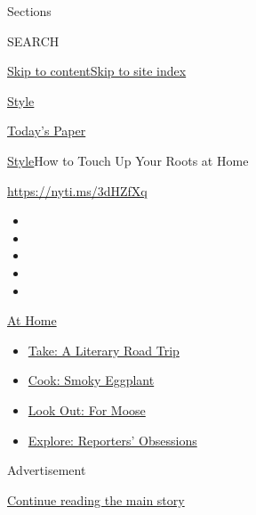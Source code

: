 Sections

SEARCH

\protect\hyperlink{site-content}{Skip to
content}\protect\hyperlink{site-index}{Skip to site index}

\href{https://www.nytimes.com/section/style}{Style}

\href{https://myaccount.nytimes.com/auth/login?response_type=cookie\&client_id=vi}{}

\href{https://www.nytimes.com/section/todayspaper}{Today's Paper}

\href{/section/style}{Style}\textbar{}How to Touch Up Your Roots at Home

\url{https://nyti.ms/3dHZfXq}

\begin{itemize}
\item
\item
\item
\item
\item
\end{itemize}

\href{https://www.nytimes.com/spotlight/at-home?action=click\&pgtype=Article\&state=default\&region=TOP_BANNER\&context=at_home_menu}{At
Home}

\begin{itemize}
\tightlist
\item
  \href{https://www.nytimes.com/2020/07/28/books/time-for-a-literary-road-trip.html?action=click\&pgtype=Article\&state=default\&region=TOP_BANNER\&context=at_home_menu}{Take:
  A Literary Road Trip}
\item
  \href{https://www.nytimes.com/2020/07/29/magazine/bored-with-your-home-cooking-some-smoky-eggplant-will-fix-that.html?action=click\&pgtype=Article\&state=default\&region=TOP_BANNER\&context=at_home_menu}{Cook:
  Smoky Eggplant}
\item
  \href{https://www.nytimes.com/2020/07/27/travel/moose-michigan-isle-royale.html?action=click\&pgtype=Article\&state=default\&region=TOP_BANNER\&context=at_home_menu}{Look
  Out: For Moose}
\item
  \href{https://www.nytimes.com/interactive/2020/at-home/even-more-reporters-editors-diaries-lists-recommendations.html?action=click\&pgtype=Article\&state=default\&region=TOP_BANNER\&context=at_home_menu}{Explore:
  Reporters' Obsessions}
\end{itemize}

Advertisement

\protect\hyperlink{after-top}{Continue reading the main story}

